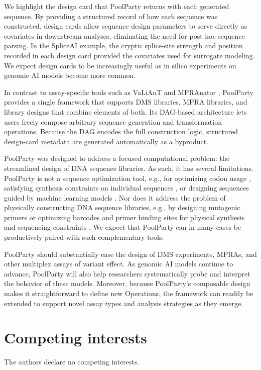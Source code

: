 \documentclass[twoside]{kinney_lab_preprintstyle}
\begin{document}
We highlight the design card that PoolParty returns with each generated sequence. By providing a structured record of how each sequence was constructed, design cards allow sequence design parameters to serve directly as covariates in downstream analyses, eliminating the need for post hoc sequence parsing. In the SpliceAI example, the cryptic splice-site strength and position recorded in each design card provided the covariates used for surrogate modeling. We expect design cards to be increasingly useful as in silico experiments on genomic AI models become more common.

In contrast to assay-specific tools such as VaLiAnT \citep{Barbon2022th} and MPRAnator \citep{GeorgakopoulosSoares2017gb}, PoolParty provides a single framework that supports DMS libraries, MPRA libraries, and library designs that combine elements of both. Its DAG-based architecture lets users freely compose arbitrary sequence generation and transformation operations. Because the DAG encodes the full construction logic, structured design-card metadata are generated automatically as a byproduct.

PoolParty was designed to address a focused computational problem: the streamlined design of DNA sequence libraries. As such, it has several limitations. PoolParty is not a sequence optimization tool, e.g., for optimizing codon usage \citep{Swainston2017rb}, satisfying synthesis constraints on individual sequences \citep{Zulkower2020jk}, or designing sequences guided by machine learning models \citep{Schreiber2025ledidi}. Nor does it address the problem of physically constructing DNA sequence libraries, e.g., by designing mutagenic primers \citep{Hiraga2021yg} or optimizing barcodes and primer binding sites for physical synthesis and sequencing constraints \citep{Hossain2024oc}. We expect that PoolParty can in many cases be productively paired with such complementary tools.

PoolParty should substantially ease the design of DMS experiments, MPRAs, and other multiplex assays of variant effect. As genomic AI models continue to advance, PoolParty will also help researchers systematically probe and interpret the behavior of these models. Moreover, because PoolParty's composable design makes it straightforward to define new Operations, the framework can readily be extended to support novel assay types and analysis strategies as they emerge.

\section*{Competing interests}
The authors declare no competing interests. 
\end{document}
